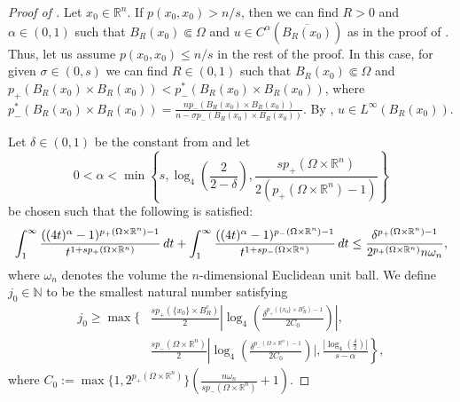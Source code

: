 \documentclass[10pt,a4paper]{amsart}
\newcommand{\N}{\mathbb{N}}
\newcommand{\R}{\mathbb{R}}
\renewcommand{\d}{\textnormal{d}}
\begin{document}
\begin{proof} [Proof of ]
Let $x_0\in\R^n$. If $p(x_0, x_0) > n/s$, then we can find $R > 0$ and $\alpha \in (0,1)$ such that $B_R(x_0) \Subset \Omega$ and $u \in C^\alpha(\overline{B_{R}(x_0)})$ as in the proof of . Thus, let us assume $p(x_0, x_0) \leq n/s$ in the rest of the proof. In this case, for given $\sigma \in (0,s)$ we can find $R \in (0,1)$ such that $B_R(x_0) \Subset \Omega$ and $p_+(B_R(x_0)\times B_R(x_0)) < p_-^{\ast}(B_R(x_0)\times B_R(x_0))$, where $p_-^{\ast}(B_R(x_0)\times B_R(x_0))= \frac{np_-(B_R(x_0)\times B_R(x_0))}{n-\sigma p_-(B_R(x_0)\times B_R(x_0))}$. By , $u\in L^{\infty}(B_R(x_0))$.

Let $\delta\in(0,1)$ be the constant from  and let 
\begin{equation}\label{eq:alphabounds}
0<\alpha < \min\left\{ s,\log_4\left(\frac{2}{2-\delta}\right), \frac{sp_{+}(\Omega\times\R^n)}{2(p_{+}(\Omega\times\R^n)-1)}\right\}
\end{equation}
be chosen such that the following is satisfied:
\begin{equation}\label{eq:propalpha1}
\int^{\infty}_1 \frac{((4t)^{\alpha} - 1)^{p_{+}(\Omega\times \R^n)-1}}{t^{1+sp_{+}(\Omega\times\R^n)}}\, \d t + \int^{\infty}_1 \frac{((4t)^{\alpha} - 1)^{p_{-}(\Omega\times \R^n)-1}}{t^{1+sp_{-}(\Omega\times\R^n)}}\, \d t \leq \frac{\delta^{p_{+}(\Omega\times\R^n)-1}}{2^{p_{+}(\Omega\times\R^n)}n\omega_n},
\end{equation}
where $\omega_n$ denotes the volume the $n$-dimensional Euclidean unit ball.
We define $j_0\in\N$ to be the smallest natural number satisfying
\begin{equation}\label{eq:j0}
\begin{aligned}
j_0\geq \max\Bigg\{ &\frac{sp_{+}(\lbrace x_0 \rbrace \times B_R^c)}{2}\left|\log_4\left(\frac{\delta^{p_{+}(\lbrace x_0 \rbrace \times B_R^c)-1}}{2C_0}\right) \right|, \\
&\frac{sp_{-}(\Omega \times \R^n)}{2}\left|\log_4\left(\frac{\delta^{p_{-}(\Omega \times \R^n)-1}}{2C_0}\right) \Bigg|, \frac{|\log_4 (\frac{\delta}{2})|}{s-\alpha} \right\},
\end{aligned}
\end{equation}
where $C_0:=\max\{1,2^{p_{+}(\Omega\times\R^n)}\}\left(\frac{n\omega_n}{sp_{-}(\Omega\times\R^n)}+1\right)$.


\end{proof}
\end{document}
